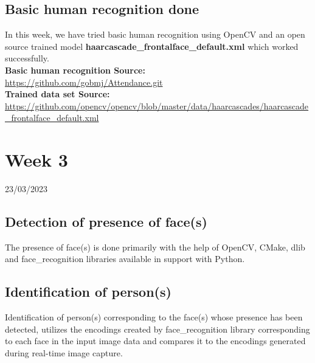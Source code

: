 \documentclass[12pt]{book}
\begin{document}
	\section{Basic human recognition done}
	In this week, we have tried basic human recognition using OpenCV and an open source trained model \textbf{haarcascade\_frontalface\_default.xml} which worked successfully. \\[12pt]
	\normalsize
	\textbf{Basic human recognition Source:} \\
	\url{https://github.com/gobmj/Attendance.git}
	\\[6pt]
	\textbf{Trained data set Source:} \\ \url{https://github.com/opencv/opencv/blob/master/data/haarcascades/haarcascade\_frontalface\_default.xml}
   
    \chapter{Week 3}
    \justifying
    \large
    23/03/2023
    
    \paragraph{}
    \section{Detection of presence of face(s)}
        The presence of face(s) is done primarily with the help of OpenCV, CMake, dlib and face\_recognition libraries available in support with Python.  
    \section{Identification of person(s)}
    Identification of person(s) corresponding to the face(s) whose presence has been detected, utilizes the encodings created by face\_recognition library corresponding to each face in the input image data and compares it to the encodings generated during real-time image capture.
    
\end{document}
